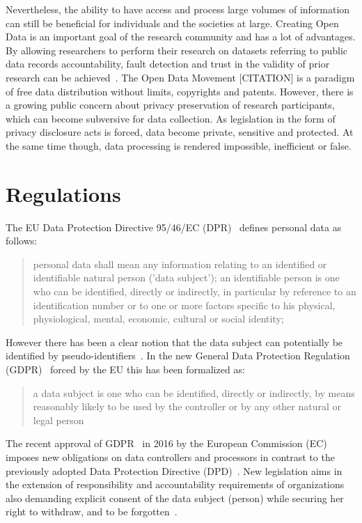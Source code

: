 \label{problem:sym:overview:open}

Nevertheless, the ability to have access and process large volumes of information can still be beneficial for individuals and the societies at large. Creating Open Data is an important goal of the research community and has a lot of advantages. By allowing researchers to perform their research on datasets referring to public data records accountability, fault detection and trust in the validity of prior research can be achieved~\cite{open_data_1}. The Open Data Movement [CITATION] is a paradigm of free data distribution without limits, copyrights and patents. However, there is a growing public concern about privacy preservation of research participants, which can become subversive for data collection. As legislation in the form of privacy disclosure acts is forced, data become private, sensitive and protected. At the same time though, data processing is rendered impossible, inefficient or false.

\section{Regulations}\label{problem:regulations}

The EU Data Protection Directive 95/46/EC (DPR)~\cite{eu-46ec-1995} defines personal data as follows:
\blockquote{
personal data shall mean any information relating to an identified or identifiable natural person ('data subject'); an identifiable person is one who can be identified, directly or indirectly, in particular by reference to an identification number or to one or more factors specific to his physical, physiological, mental, economic, cultural or social identity;
}
However there has been a clear notion that the data subject can potentially be identified by pseudo-identifiers~\cite{pii}.
In the new General Data Protection Regulation (GDPR)~\cite{gdpr} forced by the EU this has been formalized as:
\blockquote{
a data subject is one who can be identified, directly or indirectly, by means reasonably likely to be used by the controller or by any other natural or legal person
}

The recent approval of GDPR~\cite{gdpr} in 2016 by the European Commission (EC)
imposes new obligations on data controllers and processors in contrast to the previously adopted Data Protection Directive (DPD)~\cite{eu-46ec-1995}.
New legislation aims in the extension of responsibility and accountability requirements of organizations also demanding explicit
consent of the data subject (person) while securing her right to withdraw, and to be forgotten~\cite{DBLP:journals/corr/NeisseSF17}.

